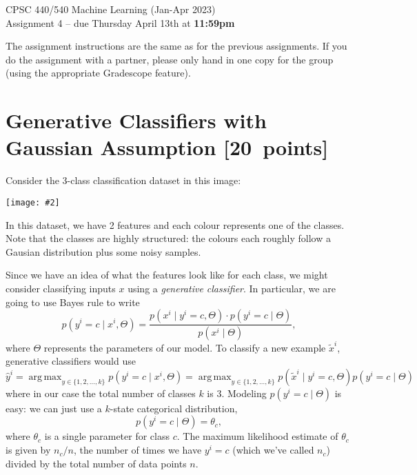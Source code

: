 \documentclass{article}
\newcommand{\pts}[1]{\textcolor{points}{[#1~points]}}
\newcommand{\centerfig}[2]{\begin{center}\texttt{[image: \#2]}\end{center}}
\DeclareMathOperator*{\argmax}{arg\,max}
\begin{document}
\begin{center}
\Large
CPSC 440/540 Machine Learning (Jan-Apr 2023)\\
Assignment 4 --
due Thursday April 13th at \textbf{11:59pm}
\end{center}


The assignment instructions are the same as for the previous assignments. If you do the assignment with a partner, please only hand in one copy for the group (using the appropriate Gradescope feature).






\section{Generative Classifiers with Gaussian Assumption \pts{20}}

Consider the 3-class classification dataset in this image:
\centerfig{.5}{figs/sample}
In this dataset, we have 2 features and each colour represents one of the classes. Note that the classes are highly structured: the colours each roughly follow a Gausian distribution plus some noisy samples.

Since we have an idea of what the features look like for each class, we might consider classifying  inputs $x$ using a \emph{generative classifier}. In particular, we are going to use Bayes rule to write
\[
p(y^i=c\mid x^i,\Theta) = \frac{p(x^i\mid y^i=c, \Theta) \cdot p(y^i=c\mid\Theta)}{p(x^i\mid\Theta)},
\]
where $\Theta$ represents the parameters of our model. To classify a new example $\tilde{x}^i$, generative classifiers would use
\[
    \hat{y}^i
    = \argmax_{y \in \{1,2,\dots,k\}} p(y^i=c \mid x^i, \Theta)
    = \argmax_{y \in \{1,2,\dots,k\}} p(\tilde{x}^i \mid y^i=c,\Theta) p(y^i=c \mid \Theta)
\]
where in our case the total number of classes $k$ is $3$.
Modeling $p(y^i=c\mid\Theta)$ is easy: we can just use a $k$-state categorical distribution,
\[
p(y^i = c \mid \Theta) = \theta_c,
\]
where $\theta_c$ is a single parameter for class $c$. The maximum likelihood estimate of $\theta_c$ is given by $n_c/n$, the number of times we have $y^i = c$ (which we've called $n_c$) divided by the total number of data points $n$.
\end{document}
